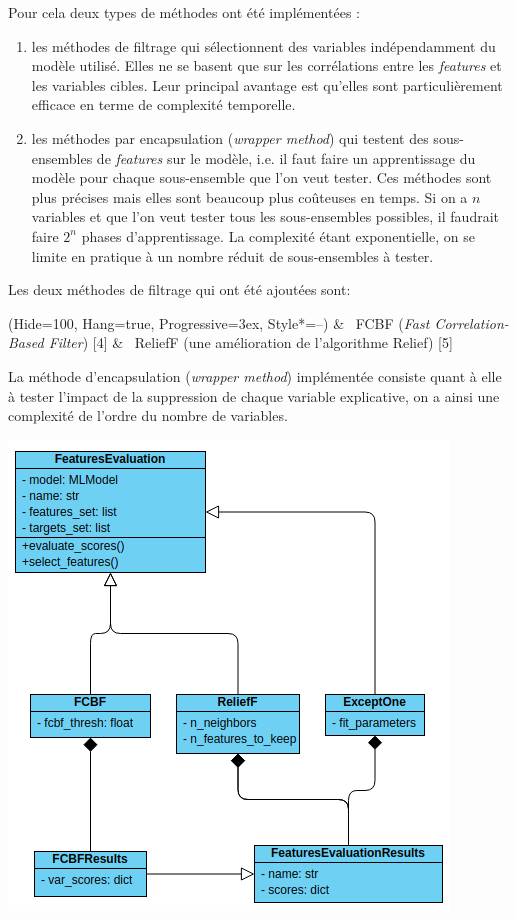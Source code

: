 Pour cela deux types de méthodes ont été implémentées : 
\begin{enumerate}
\item les méthodes de filtrage qui sélectionnent des variables indépendamment du modèle utilisé. Elles ne se basent que sur les corrélations entre les \textit{features} et les variables cibles. Leur principal avantage est qu’elles sont particulièrement efficace en terme de complexité temporelle.
\item les méthodes par encapsulation (\textit{wrapper method}) qui testent des sous-ensembles de \textit{features} sur le modèle, i.e. il faut faire un apprentissage du modèle pour chaque sous-ensemble que l’on veut tester. Ces méthodes sont plus précises mais elles sont beaucoup plus coûteuses en temps. Si on a $n$ variables et que l’on veut tester tous les sous-ensembles possibles, il faudrait faire $2^{n}$ phases d’apprentissage. La complexité étant exponentielle, on se limite en pratique à un nombre réduit de sous-ensembles à tester.
\end{enumerate}

Les deux méthodes de filtrage qui ont été ajoutées sont:
\begin{easylist}
\ListProperties(Hide=100, Hang=true, Progressive=3ex, Style*=--)
& ~FCBF (\textit{Fast Correlation-Based Filter}) [4]
& ~ReliefF (une amélioration de l’algorithme Relief) [5] 
\end{easylist}

La méthode d’encapsulation (\textit{wrapper method}) implémentée consiste quant à elle à tester l’impact de la suppression de chaque variable explicative, on a ainsi une complexité de l’ordre du nombre de variables.

\begin{center}
\includegraphics[scale=0.55]{figures/diagramme_classe_select.png}
\label{fig14}
\end{center}

